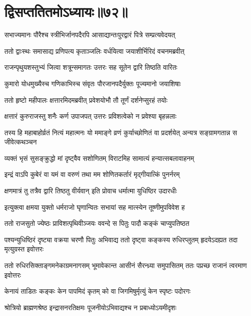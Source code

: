 \chapter{द्विसप्ततितमोऽध्यायः॥७२॥}

\twolineshloka
{सभाज्यमानः पौरैश्च स्त्रीभिर्जानपदैरपि}
{आसाद्यान्तःपुरद्वारं पित्रे सम्प्रत्यवेदयत्}


\twolineshloka
{ततो द्वाःस्थः समासाद्य प्रणिपत्य कृताञ्जलिः}
{वर्धयित्वा जयाशीर्भिरिदं वचनमब्रवीत्}


\twolineshloka
{राजन्पृथुयशस्तुभ्यं जित्वा शत्रून्समागतः}
{उत्तरः सह सूतेन द्वारि तिष्ठति वारितः}


\twolineshloka
{कुमारो योधमुख्यैस्च गणिकाभिस्च संवृतः}
{पौरजानपदैर्युक्तः पूज्यमानो जयाशिषाः}


\twolineshloka
{ततो हृष्टो महीपालः क्षत्तारमिदमब्रवीत्}
{प्रवेशयोभौ तौ तूर्णं दर्शनेप्सुरहं तयोः}


\twolineshloka
{क्षत्तारं कुरुराजस्तु शनैः कर्ण उपाजपत्}
{उत्तरः प्रविशत्वेको न प्रवेश्या बृहन्नलाः}


\threelineshloka
{तस्य हि महाबाहोर्व्रतं नित्यं महात्मनः}
{यो ममाङ्गे व्रणं कुर्याच्छोणितं वा प्रदर्शयेत्}
{अन्यत्र सङ्ग्रामगतान्न स जीवेत्कथञ्चन}


\twolineshloka
{व्यक्तं भृसं सुसङ्क्रुद्धो मां दृष्ट्वैव सशोणितम्}
{विराटमिह सामात्यं हन्यात्सबलावाहनम्}


\twolineshloka
{इन्द्रं वाऽपि कुबेरं वा यमं वा वरुणं तथा}
{मम शोणितकर्तारं मृद्गीयात्किं पुनर्नरम्}


\twolineshloka
{क्षणमात्रं तु तत्रैव द्वारि तिष्ठतु वीर्यवान्}
{इति प्रोवाच धर्मात्मा युधिष्ठिर उदारधीः}


\twolineshloka
{इत्युक्त्वा क्षमया युक्तो धर्मराजो घृणान्वितः}
{सभायां सह मात्स्येन तूष्णीमुपविवेश ह}


\twolineshloka
{ततो राजसुतो ज्येष्ठः प्राविशत्पृथिवीञ्जयः}
{ववन्दे स पितुः पादौ कङ्कं चाप्युपतिष्ठत}


\threelineshloka
{पश्यन्युधिष्ठिरं दृष्ट्या वक्रया चरणौ पितुः}
{अभिवाद्य ततो दृष्ट्वा कङ्कस्य रुधिरप्लुतम्}
{हृदयेऽदह्यत तदा मृत्युग्रस्त इवोत्तरः}


\threelineshloka
{ततो रुधिरसिक्ताङ्गमनेकाग्रमनागसम्}
{भूमावेकान्त आसीनं सैरन्ध्र्या समुपासितम्}
{ततः पप्रच्छ राजानं त्वरमाण इवोत्तरः}


\twolineshloka
{केनायं ताडितः कङ्कः केन पापमिदं कृतम्}
{को वा जिगमिषुर्मृत्युं केन स्पृष्टः पदोरगः}


\twolineshloka
{श्रोत्रियो ब्राह्मणश्रेष्ठ इन्द्रासनरतिक्षमः}
{पूजनीयोऽभिवाद्यश्च न प्रबाध्योऽयमीदृशः}


